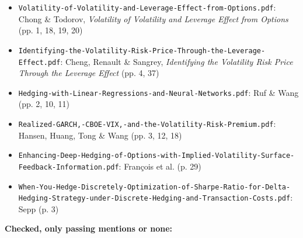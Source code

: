 \documentclass{article}
\begin{document}
\begin{itemize}

\item \texttt{Volatility-\allowbreak{}of-\allowbreak{}Volatility-\allowbreak{}and-\allowbreak{}Leverage-\allowbreak{}Effect-\allowbreak{}from-\allowbreak{}Options.\allowbreak{}pdf}: Chong \& Todorov, \emph{Volatility of Volatility and Leverage Effect from Options} (pp. 1, 18, 19, 20)

\item \texttt{Identifying-\allowbreak{}the-\allowbreak{}Volatility-\allowbreak{}Risk-\allowbreak{}Price-\allowbreak{}Through-\allowbreak{}the-\allowbreak{}Leverage-\allowbreak{}Effect.\allowbreak{}pdf}: Cheng, Renault \& Sangrey, \emph{Identifying the Volatility Risk Price Through the Leverage Effect} (pp. 4, 37)

\item \texttt{Hedging-\allowbreak{}with-\allowbreak{}Linear-\allowbreak{}Regressions-\allowbreak{}and-\allowbreak{}Neural-\allowbreak{}Networks.\allowbreak{}pdf}: Ruf \& Wang (pp. 2, 10, 11)

\item \texttt{Realized-\allowbreak{}GARCH,\allowbreak{}-\allowbreak{}CBOE-\allowbreak{}VIX,\allowbreak{}-\allowbreak{}and-\allowbreak{}the-\allowbreak{}Volatility-\allowbreak{}Risk-\allowbreak{}Premium.\allowbreak{}pdf}: Hansen, Huang, Tong \& Wang (pp. 3, 12, 18)

\item \texttt{Enhancing-\allowbreak{}Deep-\allowbreak{}Hedging-\allowbreak{}of-\allowbreak{}Options-\allowbreak{}with-\allowbreak{}Implied-\allowbreak{}Volatility-\allowbreak{}Surface-\allowbreak{}Feedback-\allowbreak{}Information.\allowbreak{}pdf}: François et al. (p. 29)

\item \texttt{When-\allowbreak{}You-\allowbreak{}Hedge-\allowbreak{}Discretely-\allowbreak{}Optimization-\allowbreak{}of-\allowbreak{}Sharpe-\allowbreak{}Ratio-\allowbreak{}for-\allowbreak{}Delta-\allowbreak{}Hedging-\allowbreak{}Strategy-\allowbreak{}under-\allowbreak{}Discrete-\allowbreak{}Hedging-\allowbreak{}and-\allowbreak{}Transaction-\allowbreak{}Costs.\allowbreak{}pdf}: Sepp (p. 3)

\end{itemize}

\textbf{Checked, only passing mentions or none:}
\end{document}
